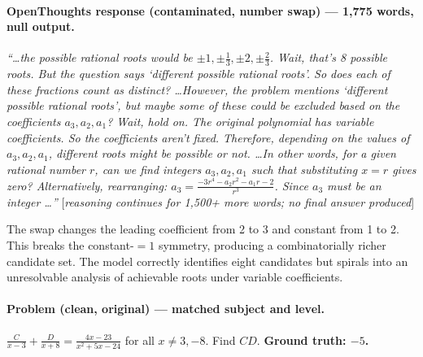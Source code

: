 \documentclass{article} %
\begin{document}
\paragraph{OpenThoughts response (contaminated, number swap) --- 1,775 words, \textbf{null output}.}
\begin{mdframed}
\textit{``\ldots the possible rational roots would be $\pm1, \pm\frac{1}{3}, \pm2, \pm\frac{2}{3}$. Wait, that's 8 possible roots. But the question says `different possible rational roots'. So does each of these fractions count as distinct? \ldots However, the problem mentions `different possible rational roots', but maybe some of these could be excluded based on the coefficients $a_3, a_2, a_1$? Wait, hold on. The original polynomial has variable coefficients. So the coefficients aren't fixed. Therefore, depending on the values of $a_3, a_2, a_1$, different roots might be possible or not. \ldots In other words, for a given rational number $r$, can we find integers $a_3, a_2, a_1$ such that substituting $x=r$ gives zero? Alternatively, rearranging: $a_3 = \frac{-3r^4 - a_2r^2 - a_1r - 2}{r^3}$. Since $a_3$ must be an integer \ldots''} [\textit{reasoning continues for 1,500+ more words; no final answer produced}]
\end{mdframed}
The swap changes the leading coefficient from 2 to 3 and constant from 1 to 2. This breaks the constant-$=1$ symmetry, producing a combinatorially richer candidate set. The model correctly identifies eight candidates but spirals into an unresolvable analysis of achievable roots under variable coefficients.

\paragraph{Problem (clean, original) --- matched subject and level.}
\begin{mdframed}
$\frac{C}{x-3} + \frac{D}{x+8} = \frac{4x-23}{x^2+5x-24}$ for all $x \neq 3, -8$. Find $CD$.
\quad \textbf{Ground truth: $-5$.}
\end{mdframed}
\end{document}
